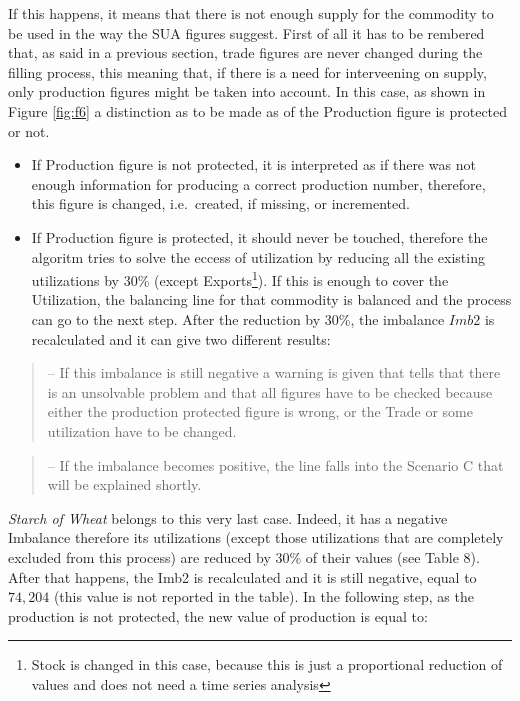 \documentclass[]{article}
\providecommand{\tightlist}{%
  \setlength{\itemsep}{0pt}\setlength{\parskip}{0pt}}
\let\rmarkdownfootnote\footnote%
\def\footnote{\protect\rmarkdownfootnote}
\begin{document}
If this happens, it means that there is not enough supply for the
commodity to be used in the way the SUA figures suggest. First of all it
has to be rembered that, as said in a previous section, trade figures
are never changed during the filling process, this meaning that, if
there is a need for interveening on supply, only production figures
might be taken into account. In this case, as shown in Figure
\ref{fig:f6} a distinction as to be made as of the Production figure is
protected or not.

\begin{itemize}
\tightlist
\item
  If Production figure is not protected, it is interpreted as if there
  was not enough information for producing a correct production number,
  therefore, this figure is changed, i.e.~created, if missing, or
  incremented.
\item
  If Production figure is protected, it should never be touched,
  therefore the algoritm tries to solve the eccess of utilization by
  reducing all the existing utilizations by 30\% (except
  Exports\footnote{Stock is changed in this case, because this is just a
    proportional reduction of values and does not need a time series
    analysis}). If this is enough to cover the Utilization, the
  balancing line for that commodity is balanced and the process can go
  to the next step. After the reduction by 30\%, the imbalance \(Imb2\)
  is recalculated and it can give two different results:
\end{itemize}

\begin{quote}
-- If this imbalance is still negative a warning is given that tells
that there is an unsolvable problem and that all figures have to be
checked because either the production protected figure is wrong, or the
Trade or some utilization have to be changed.
\end{quote}

\begin{quote}
-- If the imbalance becomes positive, the line falls into the Scenario C
that will be explained shortly.
\end{quote}

\emph{Starch of Wheat} belongs to this very last case. Indeed, it has a
negative Imbalance therefore its utilizations (except those utilizations
that are completely excluded from this process) are reduced by 30\% of
their values (see Table 8). After that happens, the Imb2 is recalculated
and it is still negative, equal to \(74,204\) (this value is not
reported in the table). In the following step, as the production is not
protected, the new value of production is equal to:
\end{document}
